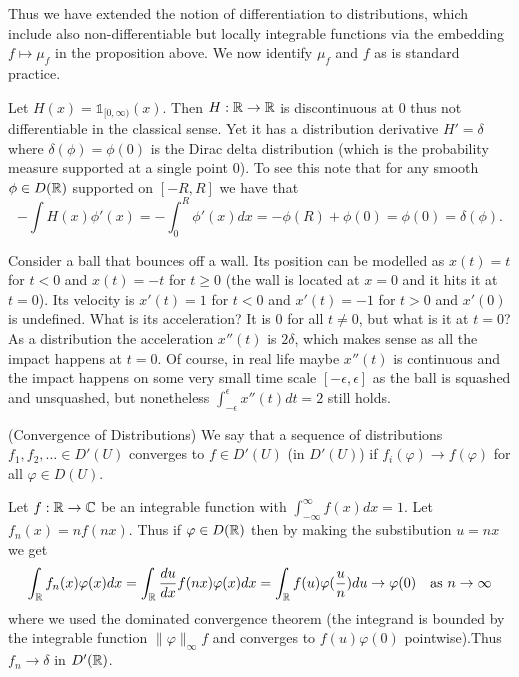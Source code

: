 \documentclass[twoside, a4paper, 10pt]{amsart}
\begin{document}
Thus we have extended the notion of differentiation to distributions, which include also non-differentiable but locally integrable functions via the embedding $f \mapsto \mu_f$ in the proposition above. We now identify $\mu_f$ and $f$ as is standard practice. 

\begin{eg} Let $H(x) = \mathds{1}_{[0, \infty)} (x)$. Then $H:\mathbb{R} \to \mathbb{R}$ is discontinuous at $0$ thus not differentiable in the classical sense. Yet it has a distribution derivative $H' = \delta$ where $\delta(\phi) = \phi(0)$ is the Dirac delta distribution (which is the probability measure supported at a single point $0$). To see this note that for any smooth $\phi \in D(\mathbb{R})$ supported on $[-R,R]$ we have that $$-\int H(x) \phi'(x) = -\int_0^R \phi'(x) dx = -\phi(R) + \phi(0) = \phi(0) = \delta(\phi).  $$

\end{eg}

\begin{eg} Consider a ball that bounces off a wall. Its position can be modelled as $x(t) = t$ for $t<0$ and $x(t) = -t$ for $t \geq 0$ (the wall is located at $x=0$ and it hits it at $t = 0$). Its velocity is $x'(t) = 1$ for $t<0$ and $x'(t) = -1$ for $t>0$ and $x'(0)$ is undefined. What is its acceleration? It is $0$ for all $t \neq 0$, but what is it at $t = 0$? As a distribution the acceleration $x''(t)$ is $2\delta$, which makes sense as all the impact happens at $t=0$. Of course, in real life maybe $x''(t)$ is continuous and the impact happens on some very small time scale $[-\epsilon, \epsilon]$ as the ball is squashed and unsquashed, but nonetheless $\int_{-\epsilon}^{\epsilon} x''(t) dt = 2$ still holds. 

\end{eg}

\begin{mydef}(Convergence of Distributions) We say that a sequence of distributions $f_1,f_2, \ldots \in D'(U)$ converges to $f \in D'(U)$ (in $D'(U)$) if $f_i(\varphi) \to f(\varphi)$ for all $\varphi \in D(U)$.

\end{mydef}

\begin{eg} Let $f:\mathbb{R} \to \mathbb{C}$ be an integrable function with $\int_{-\infty}^{\infty} f(x) dx = 1$. Let $f_n(x) = n f(nx)$. Thus if $\varphi \in D(\mathbb{R})$ then by making the substibution $u = nx$ we get $$\int_{\mathbb{R}} f_n(x) \varphi(x) dx = \int_{\mathbb{R}} \frac{du}{dx} f(nx) \varphi(x) dx = \int_{\mathbb{R}} f(u) \varphi(\frac{u}{n}) du \to \varphi(0) \quad \text{as } n \to \infty$$ where we used the dominated convergence theorem (the integrand is bounded by the integrable function $\| \varphi \|_{\infty} f$ and converges to $f(u)\varphi(0)$ pointwise).Thus $f_n \to \delta$ in $D'(\mathbb{R})$.

\end{eg}
\end{document}
